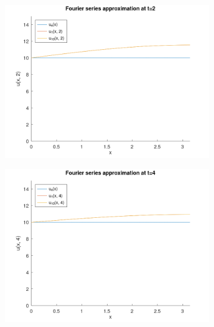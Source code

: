 \begin{solution}
    \begin{figure}[h]
        \centering
        \begin{subfigure}[b]{0.475\textwidth}
            \centering
            \includegraphics[width=\textwidth]{problem1e_fourier_series_solution_t_2.png}
            \label{fig:problem1e_t2}
        \end{subfigure}
        \hfill
        \begin{subfigure}[b]{0.475\textwidth}
            \centering
            \includegraphics[width=\textwidth]{problem1e_fourier_series_solution_t_4.png}
            \label{fig:problem1e_t4}
        \end{subfigure}


\end{figure}
\end{solution}
